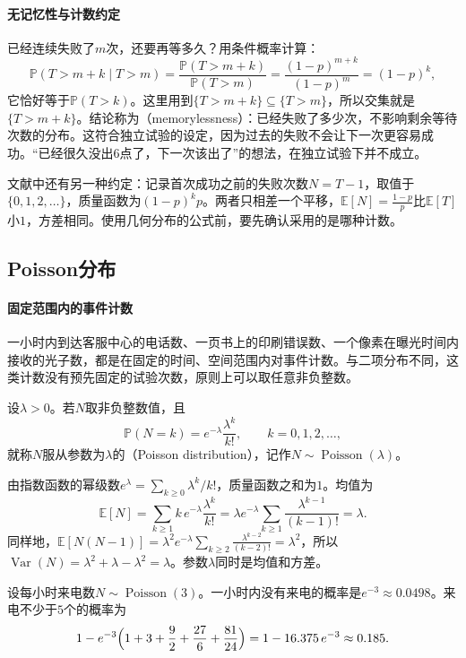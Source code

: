 \paragraph{无记忆性与计数约定}
已经连续失败了$m$次，还要再等多久？用条件概率计算：
\[
  \mathbb{P}(T>m+k\mid T>m)=\frac{\mathbb{P}(T>m+k)}{\mathbb{P}(T>m)}=\frac{(1-p)^{m+k}}{(1-p)^m}=(1-p)^k,
\]
它恰好等于$\mathbb{P}(T>k)$。这里用到$\{T>m+k\}\subseteq\{T>m\}$，所以交集就是$\{T>m+k\}$。结论称为（memorylessness）：已经失败了多少次，不影响剩余等待次数的分布。这符合独立试验的设定，因为过去的失败不会让下一次更容易成功。“已经很久没出$6$点了，下一次该出了”的想法，在独立试验下并不成立。

文献中还有另一种约定：记录首次成功之前的失败次数$N=T-1$，取值于$\{0,1,2,\dots\}$，质量函数为$(1-p)^kp$。两者只相差一个平移，$\mathbb{E}[N]=\frac{1-p}{p}$比$\mathbb{E}[T]$小$1$，方差相同。使用几何分布的公式前，要先确认采用的是哪种计数。

\subsection{Poisson分布}
\label{sec:prob-poisson}

\paragraph{固定范围内的事件计数}
一小时内到达客服中心的电话数、一页书上的印刷错误数、一个像素在曝光时间内接收的光子数，都是在固定的时间、空间范围内对事件计数。与二项分布不同，这类计数没有预先固定的试验次数，原则上可以取任意非负整数。

\begin{definition}[Poisson分布]
\label{def:prob-poisson}
设$\lambda>0$。若$N$取非负整数值，且
\[
  \mathbb{P}(N=k)=e^{-\lambda}\frac{\lambda^k}{k!},\qquad k=0,1,2,\dots,
\]
就称$N$服从参数为$\lambda$的（Poisson distribution），记作$N\sim\operatorname{Poisson}(\lambda)$。
\end{definition}

由指数函数的幂级数$e^{\lambda}=\sum_{k\geq0}\lambda^k/k!$，质量函数之和为$1$。均值为
\[
  \mathbb{E}[N]=\sum_{k\geq1}k\,e^{-\lambda}\frac{\lambda^k}{k!}=\lambda e^{-\lambda}\sum_{k\geq1}\frac{\lambda^{k-1}}{(k-1)!}=\lambda .
\]
同样地，$\mathbb{E}[N(N-1)]=\lambda^2e^{-\lambda}\sum_{k\geq2}\frac{\lambda^{k-2}}{(k-2)!}=\lambda^2$，所以$\operatorname{Var}(N)=\lambda^2+\lambda-\lambda^2=\lambda$。参数$\lambda$同时是均值和方差。

\begin{example}[客服电话]
\label{ex:prob-poisson-calls}
设每小时来电数$N\sim\operatorname{Poisson}(3)$。一小时内没有来电的概率是$e^{-3}\approx0.0498$。来电不少于$5$个的概率为
\[
  1-e^{-3}\Bigl(1+3+\frac{9}{2}+\frac{27}{6}+\frac{81}{24}\Bigr)=1-16.375\,e^{-3}\approx0.185 .
\]
\end{example}

